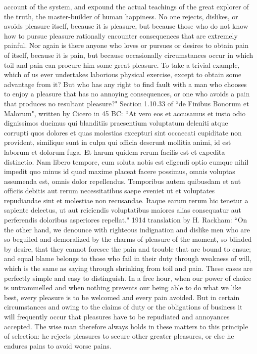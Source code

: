 account of the system, and expound the actual teachings of the great explorer of the truth,
the master-builder of human happiness. No one rejects, dislikes, or avoids pleasure itself,
because it is pleasure, but because those who do not know how to pursue pleasure rationally
encounter consequences that are extremely painful. Nor again is there anyone who loves
or pursues or desires to obtain pain of itself, because it is pain, but because occasionally
circumstances occur in which toil and pain can procure him some great pleasure. To take a
trivial example, which of us ever undertakes laborious physical exercise, except to obtain
some advantage from it? But who has any right to find fault with a man who chooses to enjoy
a pleasure that has no annoying consequences, or one who avoids a pain that produces no
resultant pleasure?"
Section 1.10.33 of “de Finibus Bonorum et Malorum", written by Cicero in 45 BC:
“At vero eos et accusamus et iusto odio dignissimos ducimus qui blanditiis praesentium
voluptatum deleniti atque corrupti quos dolores et quas molestias excepturi sint occaecati
cupiditate non provident, similique sunt in culpa qui officia deserunt mollitia animi, id est
laborum et dolorum fuga. Et harum quidem rerum facilis est et expedita distinctio. Nam
libero tempore, cum soluta nobis est eligendi optio cumque nihil impedit quo minus id quod
maxime placeat facere possimus, omnis voluptas assumenda est, omnis dolor repellendus.
Temporibus autem quibusdam et aut officiis debitis aut rerum necessitatibus saepe eveniet ut
et voluptates repudiandae sint et molestiae non recusandae. Itaque earum rerum hic tenetur a
sapiente delectus, ut aut reiciendis voluptatibus maiores alias consequatur aut perferendis
doloribus asperiores repellat."
1914 translation by H. Rackham: “On the other hand, we denounce with righteous
indignation and dislike men who are so beguiled and demoralized by the charms of pleasure
of the moment, so blinded by desire, that they cannot foresee the pain and trouble that are
bound to ensue; and equal blame belongs to those who fail in their duty through weakness
of will, which is the same as saying through shrinking from toil and pain. These cases
are perfectly simple and easy to distinguish. In a free hour, when our power of choice is
untrammelled and when nothing prevents our being able to do what we like best, every
pleasure is to be welcomed and every pain avoided. But in certain circumstances and owing
to the claims of duty or the obligations of business it will frequently occur that pleasures have
to be repudiated and annoyances accepted. The wise man therefore always holds in these
matters to this principle of selection: he rejects pleasures to secure other greater pleasures, or
else he endures pains to avoid worse pains.